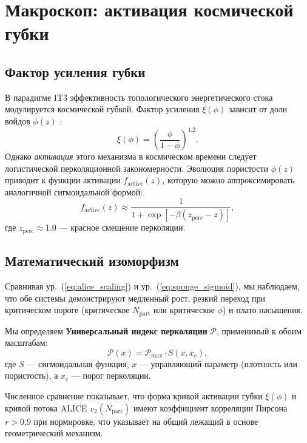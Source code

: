 \documentclass[12pt,a4paper]{article}
\begin{document}
\section{Макроскоп: активация космической губки}

\subsection{Фактор усиления губки}

В парадигме IT3 эффективность топологического энергетического стока модулируется космической губкой. Фактор усиления $\xi(\phi)$ зависит от доли войдов $\phi(z)$ \citep{Logvinovich2026c}:
\begin{equation}
\xi(\phi) = \left( \frac{\phi}{1-\phi} \right)^{1.2}.
\label{eq:sponge_power}
\end{equation}
Однако \textit{активация} этого механизма в космическом времени следует логистической перколяционной закономерности. Эволюция пористости $\phi(z)$ приводит к функции активации $f_{\mathrm{active}}(z)$, которую можно аппроксимировать аналогичной сигмоидальной формой:
\begin{equation}
f_{\mathrm{active}}(z) \approx \frac{1}{1 + \exp[-\beta(z_{\mathrm{perc}} - z)]},
\label{eq:sponge_sigmoid}
\end{equation}
где $z_{\mathrm{perc}} \approx 1.0$ — красное смещение перколяции.

\subsection{Математический изоморфизм}

Сравнивая ур.~(\ref{eq:alice_scaling}) и ур.~(\ref{eq:sponge_sigmoid}), мы наблюдаем, что обе системы демонстрируют медленный рост, резкий переход при критическом пороге (критическое $N_{\mathrm{part}}$ или критическое $\phi$) и плато насыщения.

Мы определяем \textbf{Универсальный индекс перколяции} $\mathcal{P}$, применимый к обоим масштабам:
\begin{equation}
\mathcal{P}(x) = \mathcal{P}_{\max} \cdot S(x, x_c),
\end{equation}
где $S$ — сигмоидальная функция, $x$ — управляющий параметр (плотность или пористость), а $x_c$ — порог перколяции.

Численное сравнение показывает, что форма кривой активации губки $\xi(\phi)$ и кривой потока ALICE $v_2(N_{\mathrm{part}})$ имеют коэффициент корреляции Пирсона $r > 0.9$ при нормировке, что указывает на общий лежащий в основе геометрический механизм.
\end{document}
